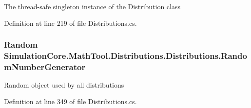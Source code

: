 The thread-\/safe singleton instance of the Distribution class 



Definition at line 219 of file Distributions.\+cs.

\subsubsection[{\texorpdfstring{Random\+Number\+Generator}{RandomNumberGenerator}}]{\setlength{\rightskip}{0pt plus 5cm}Random Simulation\+Core.\+Math\+Tool.\+Distributions.\+Distributions.\+Random\+Number\+Generator\hspace{0.3cm}{\ttfamily [get]}}\hypertarget{class_simulation_core_1_1_math_tool_1_1_distributions_1_1_distributions_ae3222bb1df4086b63fa3810de3bbc2c0}{}\label{class_simulation_core_1_1_math_tool_1_1_distributions_1_1_distributions_ae3222bb1df4086b63fa3810de3bbc2c0}


Random object used by all distributions 



Definition at line 349 of file Distributions.\+cs.

